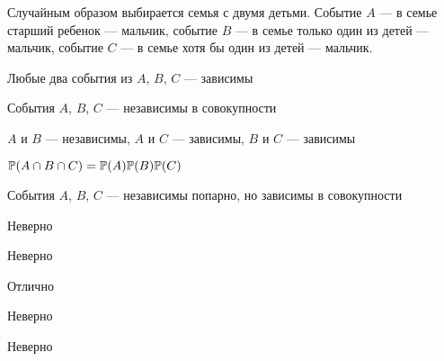 
\begin{question}
Случайным образом выбирается семья с двумя детьми. Событие \(A\) — в
семье старший ребенок — мальчик, событие \(B\) — в семье только один
из детей — мальчик, событие \(C\) — в семье хотя бы один из детей
--- мальчик.
\begin{answerlist}
  \item Любые два события из \(A\), \(B\), \(C\) — зависимы
  \item События \(A\), \(B\), \(C\) — независимы в совокупности
  \item \(A\) и \(B\) — независимы, \(A\) и \(C\) — зависимы, \(B\) и \(C\)
--- зависимы
  \item \(\P(A\cap B\cap C)=\P(A)\P(B)\P(C)\)
  \item События \(A\), \(B\), \(C\) — независимы попарно, но зависимы в
совокупности
\end{answerlist}
\end{question}

\begin{solution}
\begin{answerlist}
  \item Неверно
  \item Неверно
  \item Отлично
  \item Неверно
  \item Неверно
\end{answerlist}
\end{solution}

